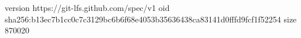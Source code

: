 version https://git-lfs.github.com/spec/v1
oid sha256:b13ec7b1cc0c7c3129bc6b6f68e4053b35636438ca83141d0fffd9fcf1f52254
size 870020

